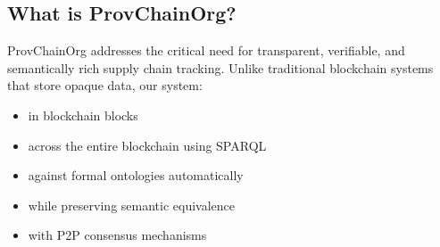 \documentclass[letterpaper,10pt,english]{sphinxmanual}
\begin{document}
\subsection{What is ProvChainOrg?}
\label{\detokenize{overview/index:what-is-provchainorg}}
\sphinxAtStartPar
ProvChainOrg addresses the critical need for transparent, verifiable, and semantically rich supply chain tracking. Unlike traditional blockchain systems that store opaque data, our system:
\begin{itemize}
\item {} 
\sphinxAtStartPar
{} in blockchain blocks

\item {} 
\sphinxAtStartPar
{} across the entire blockchain using SPARQL

\item {} 
\sphinxAtStartPar
{} against formal ontologies automatically

\item {} 
\sphinxAtStartPar
{} while preserving semantic equivalence

\item {} 
\sphinxAtStartPar
{} with P2P consensus mechanisms

\end{itemize}
\end{document}
